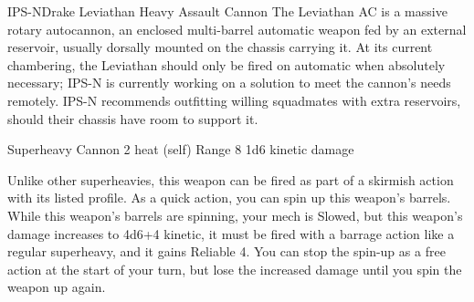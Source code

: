 \begin{mech}{IPS-N}{Drake}
Leviathan Heavy Assault Cannon
The Leviathan AC is a massive rotary autocannon, an enclosed multi-barrel automatic weapon fed by an external reservoir, usually dorsally mounted on the chassis carrying it. At its current chambering, the Leviathan should only be fired on automatic when absolutely necessary; IPS-N is currently working on a solution to meet the cannon’s needs remotely. IPS-N recommends outfitting willing squadmates with extra reservoirs, should their chassis have room to support it.

Superheavy Cannon
2 heat (self)
Range 8
1d6 kinetic damage

Unlike other superheavies, this weapon can be fired as part of a skirmish action with its listed profile.
As a quick action, you can spin up this weapon’s barrels. While this weapon’s barrels are spinning, your mech is Slowed, but this weapon’s damage increases to 4d6+4 kinetic, it must be fired with a barrage action like a regular superheavy, and it gains Reliable 4. You can stop the spin-up as a free action at the start of your turn, but lose the increased damage until you spin the weapon up again.


\end{mech}
